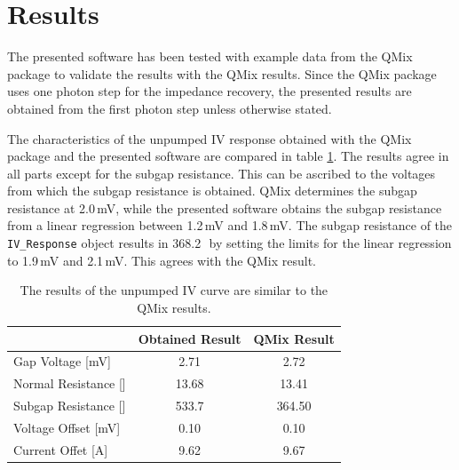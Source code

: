 \documentclass[]{article}
\begin{document}
\section{Results}
The presented software has been tested with example data from the QMix package to validate the results with the QMix results. Since the QMix package uses one photon step for the impedance recovery, the presented results are obtained from the first photon step unless otherwise stated.

The characteristics of the unpumped IV response obtained with the QMix package and the presented software are compared in table \ref{tab:IV}. The results agree in all parts except for the subgap resistance. This can be ascribed to the voltages from which the subgap resistance is obtained. QMix determines the subgap resistance at 2.0\,mV, while the presented software obtains the subgap resistance from a linear regression between 1.2\,mV and 1.8\,mV. The subgap resistance of the \texttt{IV\_Response} object results in 368.2\,\textOmega~by setting the limits for the linear regression to 1.9\,mV and 2.1\,mV. This agrees with the QMix result.

\begin{table}[]
	\centering
	\renewcommand{\arraystretch}{1.5}
	\begin{tabular}{l|c|c}
		 & Obtained Result & QMix Result \\\hline
		Gap Voltage [mV] & 2.71 & 2.72 \\
		Normal Resistance [\textOmega] & 13.68 & 13.41 \\
		Subgap Resistance [\textOmega] & 533.7 & 364.50 \\
		Voltage Offset [mV] & 0.10 & 0.10 \\
		Current Offet [\textmu A] & 9.62 & 9.67
	\end{tabular}
	\caption{The results of the unpumped IV curve are similar to the QMix results.}
	\label{tab:IV}
\end{table}
\end{document}
